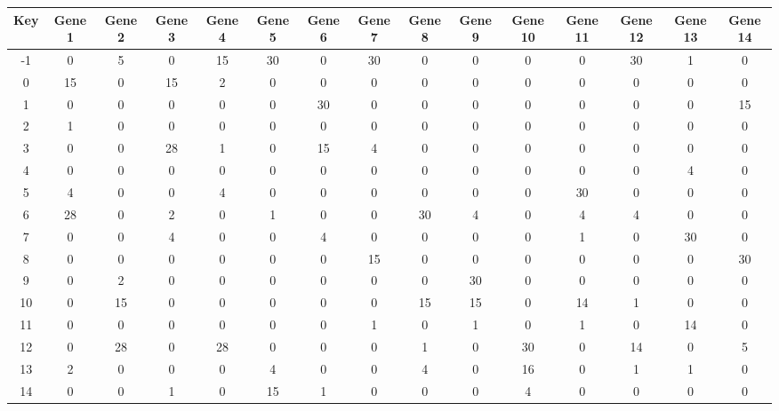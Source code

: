 \begin{tabular}{|c|c|c|c|c|c|c|c|c|c|c|c|c|c|c|}
\hline
Key & Gene 1 & Gene 2 & Gene 3 & Gene 4 & Gene 5 & Gene 6 & Gene 7 & Gene 8 & Gene 9 & Gene 10 & Gene 11 & Gene 12 & Gene 13 & Gene 14 \\
\hline
-1 & 0 & 5 & 0 & 15 & 30 & 0 & 30 & 0 & 0 & 0 & 0 & 30 & 1 & 0 \\
0 & 15 & 0 & 15 & 2 & 0 & 0 & 0 & 0 & 0 & 0 & 0 & 0 & 0 & 0 \\
1 & 0 & 0 & 0 & 0 & 0 & 30 & 0 & 0 & 0 & 0 & 0 & 0 & 0 & 15 \\
2 & 1 & 0 & 0 & 0 & 0 & 0 & 0 & 0 & 0 & 0 & 0 & 0 & 0 & 0 \\
3 & 0 & 0 & 28 & 1 & 0 & 15 & 4 & 0 & 0 & 0 & 0 & 0 & 0 & 0 \\
4 & 0 & 0 & 0 & 0 & 0 & 0 & 0 & 0 & 0 & 0 & 0 & 0 & 4 & 0 \\
5 & 4 & 0 & 0 & 4 & 0 & 0 & 0 & 0 & 0 & 0 & 30 & 0 & 0 & 0 \\
6 & 28 & 0 & 2 & 0 & 1 & 0 & 0 & 30 & 4 & 0 & 4 & 4 & 0 & 0 \\
7 & 0 & 0 & 4 & 0 & 0 & 4 & 0 & 0 & 0 & 0 & 1 & 0 & 30 & 0 \\
8 & 0 & 0 & 0 & 0 & 0 & 0 & 15 & 0 & 0 & 0 & 0 & 0 & 0 & 30 \\
9 & 0 & 2 & 0 & 0 & 0 & 0 & 0 & 0 & 30 & 0 & 0 & 0 & 0 & 0 \\
10 & 0 & 15 & 0 & 0 & 0 & 0 & 0 & 15 & 15 & 0 & 14 & 1 & 0 & 0 \\
11 & 0 & 0 & 0 & 0 & 0 & 0 & 1 & 0 & 1 & 0 & 1 & 0 & 14 & 0 \\
12 & 0 & 28 & 0 & 28 & 0 & 0 & 0 & 1 & 0 & 30 & 0 & 14 & 0 & 5 \\
13 & 2 & 0 & 0 & 0 & 4 & 0 & 0 & 4 & 0 & 16 & 0 & 1 & 1 & 0 \\
14 & 0 & 0 & 1 & 0 & 15 & 1 & 0 & 0 & 0 & 4 & 0 & 0 & 0 & 0 \\
\hline
\end{tabular}